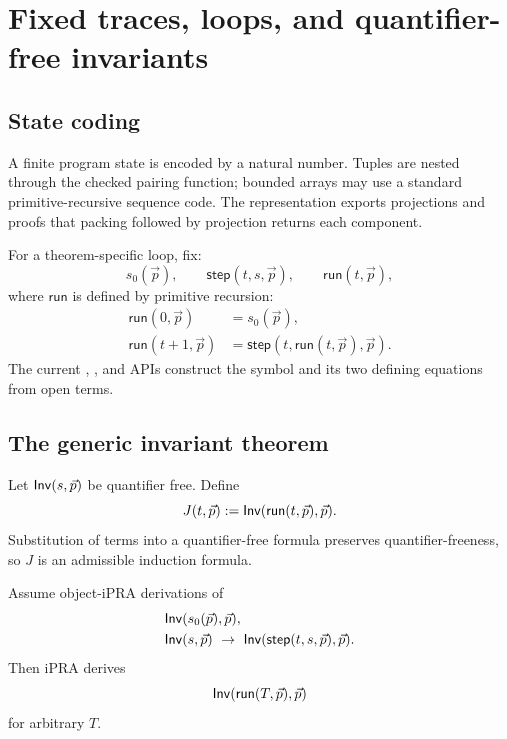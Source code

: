 
\section{Fixed traces, loops, and quantifier-free invariants}
\label{sec:trace}

\subsection{State coding}

A finite program state is encoded by a natural number.  Tuples are nested
through the checked pairing function; bounded arrays may use a standard
primitive-recursive sequence code.  The representation exports projections
and proofs that packing followed by projection returns each component.

For a theorem-specific loop, fix:
\[
   s_0(\vec p),\qquad
   \mathsf{step}(t,s,\vec p),\qquad
   \mathsf{run}(t,\vec p),
\]
where \(\mathsf{run}\) is defined by primitive recursion:
\[
\begin{aligned}
 \mathsf{run}(0,\vec p)&=s_0(\vec p),\\
 \mathsf{run}(t+1,\vec p)
   &=\mathsf{step}(t,\mathsf{run}(t,\vec p),\vec p).
\end{aligned}
\]
The current , , and  APIs construct
the symbol and its two defining equations from open terms.

\subsection{The generic invariant theorem}

Let \(\mathsf{Inv}(s,\vec p)\) be quantifier free.  Define
\[
      J(t,\vec p)\mathrel{:=}
       \mathsf{Inv}(\mathsf{run}(t,\vec p),\vec p).
\]
Substitution of terms into a quantifier-free formula preserves
quantifier-freeness, so \(J\) is an admissible induction formula.

\begin{theorem}
Assume object-iPRA derivations of
\[
\begin{aligned}
 &\mathsf{Inv}(s_0(\vec p),\vec p),\\
 &\mathsf{Inv}(s,\vec p)
    \ \rightarrow\
   \mathsf{Inv}(\mathsf{step}(t,s,\vec p),\vec p).
\end{aligned}
\]
Then iPRA derives
\[
       \mathsf{Inv}(\mathsf{run}(T,\vec p),\vec p)
\]
for arbitrary \(T\).
\end{theorem}

